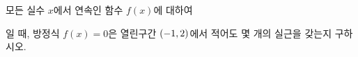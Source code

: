 모든 실수 $x$에서 연속인 함수 $f(x)$에 대하여 \par\smallskip{}\par\smallskip\noindent 일 때, 방정식 $f(x)=0$은 열린구간 $(-1{,}\mkern3mu\mathopen{}2)$에서 적어도 몇 개의 실근을 갖는지 구하시오.
